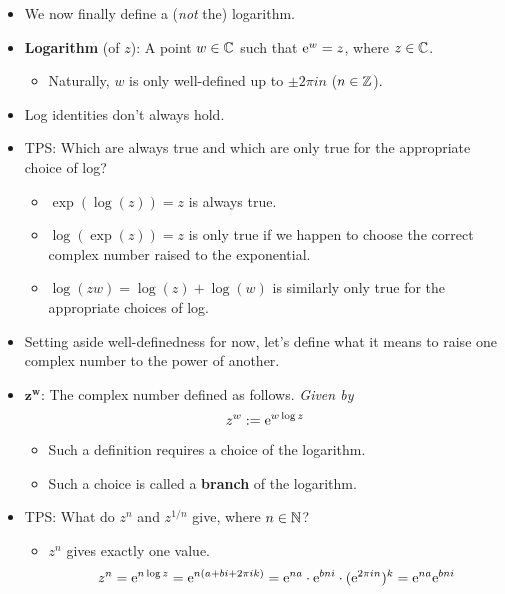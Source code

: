 \documentclass[../notes.tex]{subfiles}
\begin{document}
\begin{itemize}
\begin{proof}
    \end{proof}
    \item We now finally define a (\emph{not} the) logarithm.
    \item \textbf{Logarithm} (of $z$): A point $w\in\C$ such that $\e[w]=z$, where $z\in\C$.
    \begin{itemize}
        \item Naturally, $w$ is only well-defined up to $\pm 2\pi in$ ($n\in\Z$).
    \end{itemize}
    \item Log identities don't always hold.
    \item TPS: Which are always true and which are only true for the appropriate choice of log?
    \begin{itemize}
        \item $\exp(\log(z))=z$ is always true.
        \item $\log(\exp(z))=z$ is only true if we happen to choose the correct complex number raised to the exponential.
        \item $\log(zw)=\log(z)+\log(w)$ is similarly only true for the appropriate choices of log.
    \end{itemize}
    \item Setting aside well-definedness for now, let's define what it means to raise one complex number to the power of another.
    \item $\bm{z^w}$: The complex number defined as follows. \emph{Given by}
    \begin{equation*}
        z^w := \e[w\log z]
    \end{equation*}
    \begin{itemize}
        \item Such a definition requires a choice of the logarithm.
        \item Such a choice is called a \textbf{branch} of the logarithm.
    \end{itemize}
    \item TPS: What do $z^n$ and $z^{1/n}$ give, where $n\in\N$?
    \begin{itemize}
        \item $z^n$ gives exactly one value.
        \begin{equation*}
            z^n = \e[n\log z]
            = \e[n(a+bi+2\pi ik)]
            = \e[na]\cdot\e[bni]\cdot(\e[2\pi in])^k
            = \e[na]\e[bni]
        \end{equation*}
        \begin{itemize}

\end{itemize}
\end{itemize}
\end{itemize}
\end{document}
